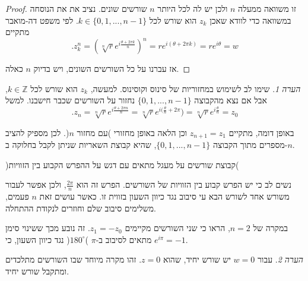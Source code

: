 \documentclass[
  hebrew,
  12pt,
  a4paper,
  oneside]{book}
\theoremstyle{definition}
\theoremstyle{remark}
\theoremstyle{plain}
\theoremstyle{remark}
\newtheorem*{remark}{הערה}
\begin{document}
\begin{proof}
זו משוואה ממעלה \(n\) ולכן יש לה לכל היותר \(n\) שורשים שונים. נציב את
את הנוסחה במשוואה כדי לוודא שאכן \(z_{k}\) הוא שורש לכל
\(k\in\{0,1,...,n-1\}\). לפי משפט דה-מואבר מתקיים
\[.z_{k}^{n}=(\sqrt[n]{r}e^{i\frac{\theta+2\pi k}{n}})^{n}=re^{i(\theta+2\pi k)}=re^{i\theta}=w\]

אז עברנו על כל השורשים השונים, ויש בדיוק \(n\) כאלה.
\end{proof}

\begin{remark}
שימו לב לשימוש במחזוריות של סינוס וקוסינוס. למעשה, \(z_{k}\) הוא שורש
לכל \(k\in\mathbb{Z}\), אבל אם נצא מהקבוצה \(\{0,1,...,n-1\}\) נחזור על
השורשים שכבר חישבנו. למשל
\[.z_{n}=\sqrt[n]{r}e^{i\frac{\theta+2\pi n}{n}}=\sqrt[n]{r}e^{i(\frac{\theta}{n}+2\pi})=\sqrt[n]{r}e^{i\frac{\theta}{n}}=z_{0}\]

באופן דומה, מתקיים \(z_{n+1}=z_{1}\) וכן הלאה באופן מחזורי )עם מחזור
\(n\)(. לכן מספיק להציב מספרים מתוך הקבוצה \(\{0,1,...,n-1\}\), שהיא
קבוצת השאריות שניתן לקבל בחלוקה ב-\(n\).

)קבוצת שורשים על מעגל מתאים עם דגש על ההפרש הקבוע בין הזוויות(

נשים לב כי יש הפרש קבוע בין הזוויות של השורשים. הפרש זה הוא
\(\frac{2\pi}{n}\), ולכן אפשר לעבור משורש אחד לשורש הבא עי סיבוב נגד
כיוון השעון בזווית זו. כאשר עושים זאת \(n\) פעמים, משלימים סיבוב שלם
וחוזרים לנקודת ההתחלה.
\end{remark}

במקרה של \(n=2\), הראו כי שני השורשים מקיימים \(z_{1}=-z_{0}\). זה נובע
מכך ששינוי סימן מתאים לסיבוב ב-\(\pi\) )\(180^{\circ}\)( נגד כיוון
השעון, כי \(e^{i\pi}=-1\).

\begin{remark}
עבור \(w=0\) יש שורש יחיד, שהוא \(z=0\). זהו מקרה מיוחד שבו השורשים
מתלכדים ומתקבל שורש יחיד.
\end{remark}
\end{document}
